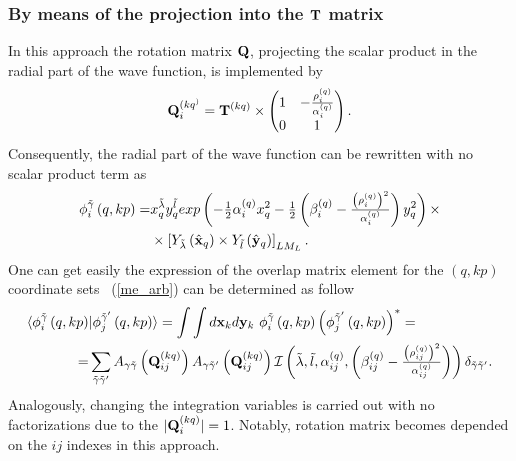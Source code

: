 \documentclass[
12pt, %
oneside, %
english, %
onehalfspacing, %
headsepline, %
]{MastersDoctoralThesis} %
\begin{document}
\subsubsection{By means of the projection into the ${\bf T}$ matrix}
\label{overlap_by_proj}
In this approach the rotation matrix ${\bf Q}$, projecting the scalar product in the radial part of the wave function, is implemented by
\begin{equation}
{\bf Q}_i^{(kq^)}= {\bf T}^{(kq)} \times
\begin{pmatrix}
1 & -\tfrac{\rho^{(q)}_{i}}{\alpha^{(q)}_i} \\ 
0 & 1
\end{pmatrix} .
\end{equation}
Consequently, the radial part of the wave function can be rewritten with no scalar product term as
\begin{align}
\phi_{i}^{\tilde{\gamma} } \left(q, kp \right)  =  &
 x_{q}^{\tilde{\lambda}} y_{q}^{\tilde{l}} exp\left(- \tfrac{1}{2} \alpha^{(q)}_{i} x_{q}^{2} - \tfrac{1}{2} \left(  \beta^{(q)}_{i} - \tfrac{\left(\rho^{(q)}_i\right)^2}{\alpha^{(q)}_i} \right)  y_{q}^{2}  \right) 
\times  \nonumber \\ 
&\times  \left[ Y_{\tilde{\lambda}} \left(  \hat{ \bf x}_q \right) \times Y_{\tilde{l}} \left( \hat{\bf y}_q \right) \right]_{LM_L}.
\end{align}
One can get easily the expression of the overlap matrix element for the $(q,kp)$ coordinate sets ~(\ref{me_arb}) can be determined as follow
\begin{align}
\langle \phi_{i}^{\tilde{\gamma}}\left(q,kp \right) & \vert 
\phi_{j}^{\tilde{\gamma}^{\prime}}\left(q,kp \right) \rangle =
\int \int d{\bf x}_k d{\bf y}_k  ~\phi_{i}^{\tilde{\gamma}}\left(q,kp \right) \left( \phi_{j}^{\tilde{\gamma}^{\prime}}\left(q,kp \right) \right)^{*} =  \nonumber \\
=& \sum_{\tilde{\gamma}\tilde{\gamma}^{\prime}}  
A_{\gamma\tilde{\gamma}}\left( {\bf Q}_{ij}^{(kq)} \right)
 A_{\gamma\tilde{\gamma}^{\prime}}\left( {\bf Q}_{ij}^{(kq)} \right) \mathcal{I} \left( \tilde{\lambda}, \tilde{l}, \alpha^{(q)}_{ij}, \left(  \beta^{(q)}_{ij} - \tfrac{\left(\rho^{(q)}_{ij}\right)^2}{\alpha^{(q)}_{ij}} \right) \right) \delta_{\tilde{\gamma}\tilde{\gamma}^{\prime}}.
 \label{projectionMethod}
\end{align}
Analogously, changing the integration variables is carried out with no factorizations due to the $\vert {\bf Q}_i^{(kq)} \vert = 1$. Notably,   rotation matrix becomes depended on the $ij$ indexes in this approach.
\end{document}

